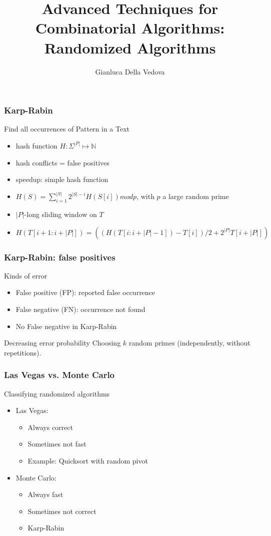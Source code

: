 \documentclass[12pt,aspectratio=169]{beamer}
\author{Gianluca Della Vedova}
\title[Advanced Algorithms]{Advanced Techniques for Combinatorial Algorithms:
Randomized Algorithms}
\institute[]{Univ. Milano--Bicocca\\
  \texttt{https://gianluca.dellavedova.org}}
\begin{document}
\begin{frame}
  \titlepage
\end{frame}

\begin{frame}[fragile]
\frametitle{Karp-Rabin}
\begin{block}{Find all occurrences of Pattern in a Text}
\begin{itemize}
\item
    hash function $H: \Sigma^{|P|}\mapsto \mathbb{N}$
\item
    hash conflicts = false positives
\item
    speedup: simple hash function
\item
$H(S)=\sum_{i=1}^{|S|} 2^{|S| - i}H(S[i]) mod p$, with $p$ a large random prime
\item
    $|P|$-long sliding window on $T$
\item
$H(T[i+1:i+|P|]) = \left(\left(H(T[i:i+|P|-1]) - T[i] \right) / 2 + 2^{|P|}T[i+|P|] \right)$
\end{itemize}
\end{block}
\end{frame}


\begin{frame}[fragile]
\frametitle{Karp-Rabin: false positives}
\begin{block}{Kinds of error}
\begin{itemize}
\item
False positive (FP): reported false occurrence
\item
False negative (FN): occurrence not found
\item
    No False negative in Karp-Rabin
\end{itemize}
\end{block}
\begin{block}{Decreasing error probability}
  Choosing $k$ random primes (independently, without repetitions).
\end{block}

\end{frame}

\begin{frame}[fragile]
\frametitle{Las Vegas vs.
  Monte Carlo}
\begin{block}{Classifying randomized algorithms}
\begin{itemize}
\item
Las Vegas:
\begin{itemize}
\item
Always correct
\item
Sometimes not fast
\item
Example: Quicksort with random pivot
\end{itemize}
\item
Monte Carlo:
\begin{itemize}
\item
Always fast
\item
Sometimes not correct
\item
Karp-Rabin
\end{itemize}
\end{itemize}
\end{block}
\end{frame}
\end{document}
